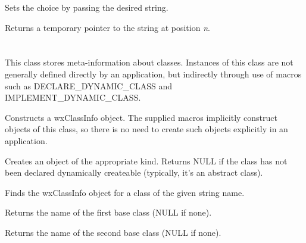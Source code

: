 Sets the choice by passing the desired string.



Returns a temporary pointer to the string at position {\it n}.

\section{}\label{wxclassinfo}


This class stores meta-information about classes. Instances of this class are
not generally defined directly by an application, but indirectly through use
of macros such as DECLARE\_DYNAMIC\_CLASS and IMPLEMENT\_DYNAMIC\_CLASS.



Constructs a wxClassInfo object. The supplied macros implicitly construct objects of this
class, so there is no need to create such objects explicitly in an application.



Creates an object of the appropriate kind. Returns NULL if the class has not been declared
dynamically createable (typically, it's an abstract class).



Finds the wxClassInfo object for a class of the given string name.



Returns the name of the first base class (NULL if none).



Returns the name of the second base class (NULL if none).


